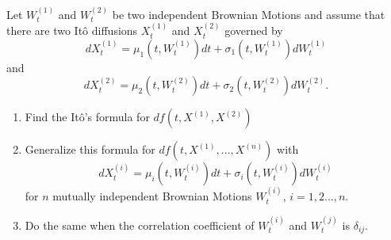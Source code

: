     \problem
    \begin{question}
        Let $W^{(1)}_t$ and $W^{(2)}_t$ be two independent Brownian Motions
        and assume that there are two It\^o diffusions $X^{(1)}_t$ and $X^{(2)}_t$ governed by
        \[dX^{(1)}_t=\mu_1(t,W^{(1)}_t)dt+\sigma_1(t,W^{(1)}_t)dW^{(1)}_t\]
        and
        \[dX^{(2)}_t=\mu_2(t,W^{(2)}_t)dt+\sigma_2(t,W^{(2)}_t)dW^{(2)}_t.\]
        \begin{enumerate}[label=(\alph*)]
        \item Find the It\^o's formula for $df(t,X^{(1)},X^{(2)})$
        \item Generalize this formula for $df(t,X^{(1)},...,X^{(n)})$ with
        \[dX^{(i)}_t=\mu_i(t,W^{(i)}_t)dt+\sigma_i(t,W^{(i)}_t)dW^{(i)}_t\]
        for $n$ mutually independent Brownian Motions $W^{(i)}_t$, $i=1,2...,n$.
        \item Do the same when the correlation coefficient of $W^{(i)}_t$
        and $W^{(j)}_t$ is $\delta_{ij}$.
\end{enumerate}
    \end{question}
